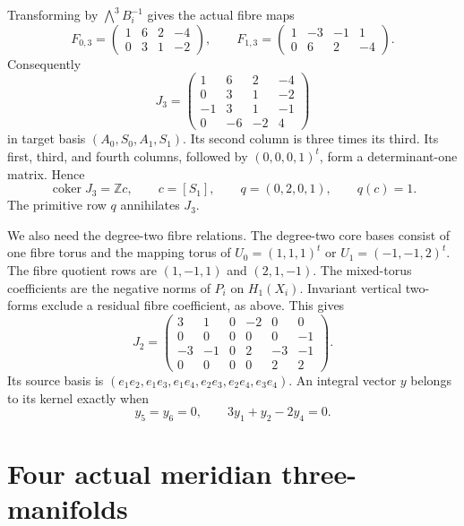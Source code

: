 Transforming by $\bigwedge^3B_i^{-1}$ gives the actual fibre maps
\begin{equation}\label{th:eq:F3}
F_{0,3}=\begin{pmatrix}1&6&2&-4\\0&3&1&-2\end{pmatrix},\qquad
F_{1,3}=\begin{pmatrix}1&-3&-1&1\\0&6&2&-4\end{pmatrix}.
\end{equation}
Consequently
\begin{equation}\label{th:eq:J3}
J_3=\begin{pmatrix}
1&6&2&-4\\0&3&1&-2\\-1&3&1&-1\\0&-6&-2&4
\end{pmatrix}
\end{equation}
in target basis $(A_0,S_0,A_1,S_1)$.
Its second column is three times its third.
Its first, third, and fourth columns, followed by $(0,0,0,1)^t$,
form a determinant-one matrix.
Hence
\begin{equation}\label{th:eq:c}
\operatorname{coker}J_3=\mathbb Zc,\qquad
c=[S_1],\qquad q=(0,2,0,1),\qquad q(c)=1.
\end{equation}
The primitive row $q$ annihilates $J_3$.

We also need the degree-two fibre relations.
The degree-two core bases consist of one fibre torus and the mapping torus
of $U_0=(1,1,1)^t$ or $U_1=(-1,-1,2)^t$.
The fibre quotient rows are $(1,-1,1)$ and $(2,1,-1)$.
The mixed-torus coefficients are the negative norms of $P_i$ on $H_1(X_i)$.
Invariant vertical two-forms exclude a residual fibre coefficient, as above.
This gives
\begin{equation}\label{th:eq:J2}
J_2=
\begin{pmatrix}
3&1&0&-2&0&0\\0&0&0&0&0&-1\\
-3&-1&0&2&-3&-1\\0&0&0&0&2&2
\end{pmatrix}.
\end{equation}
Its source basis is $(e_1e_2,e_1e_3,e_1e_4,e_2e_3,e_2e_4,e_3e_4)$.
An integral vector $y$ belongs to its kernel exactly when
\begin{equation}\label{th:eq:kerJ2}
y_5=y_6=0,\qquad 3y_1+y_2-2y_4=0.
\end{equation}

\section{Four actual meridian three-manifolds}

